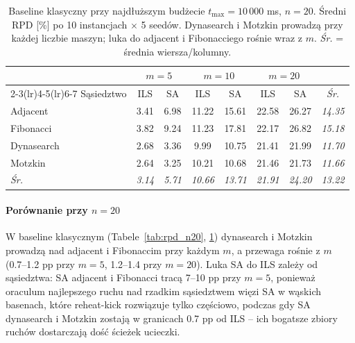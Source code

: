 \documentclass[11pt,a4paper]{article}
\begin{document}
\begin{table}[h]
\centering
\caption{Baseline klasyczny przy najdłuższym budżecie
  $t_{\max}=10\,000$ ms, $n=20$. Średni RPD [\%] po 10 instancjach
  $\times$ 5 seedów. Dynasearch i Motzkin prowadzą przy każdej
  liczbie maszyn; luka do adjacent i Fibonacciego rośnie wraz z $m$.
  \emph{Śr.} = średnia wiersza/kolumny.}
\label{tab:rpd_n20_full}
\small
\setlength{\tabcolsep}{4pt}
\begin{tabular}{@{}lcccccc@{\quad}c@{}}
\toprule
 & \multicolumn{2}{c}{$m=5$} & \multicolumn{2}{c}{$m=10$} & \multicolumn{2}{c}{$m=20$} & \\
\cmidrule(lr){2-3}\cmidrule(lr){4-5}\cmidrule(lr){6-7}
Sąsiedztwo & ILS & SA & ILS & SA & ILS & SA & \emph{Śr.} \\
\midrule
Adjacent    & 3.41 &  6.98 & 11.22 & 15.61 & 22.58 & 26.27 & \emph{14.35} \\
Fibonacci   & 3.82 &  9.24 & 11.23 & 17.81 & 22.17 & 26.82 & \emph{15.18} \\
Dynasearch  & 2.68 &  3.36 &  9.99 & 10.75 & 21.41 & 21.99 & \emph{11.70} \\
Motzkin     & 2.64 &  3.25 & 10.21 & 10.68 & 21.46 & 21.73 & \emph{11.66} \\
\midrule
\emph{Śr.}  & \emph{3.14} & \emph{5.71} & \emph{10.66} & \emph{13.71} & \emph{21.91} & \emph{24.20} & \emph{13.22} \\
\bottomrule
\end{tabular}
\end{table}

\paragraph{Porównanie przy $n=20$}
W baseline klasycznym (Tabele~\ref{tab:rpd_n20},
\ref{tab:rpd_n20_full}) dynasearch i Motzkin prowadzą nad adjacent
i Fibonaccim przy każdym $m$, a przewaga rośnie z $m$ (0.7--1.2 pp
przy $m=5$, 1.2--1.4 przy $m=20$). Luka SA do ILS zależy od
sąsiedztwa: SA adjacent i Fibonacci tracą 7--10 pp przy $m=5$,
ponieważ oraculum najlepszego ruchu nad rzadkim sąsiedztwem więzi SA
w wąskich basenach, które reheat-kick rozwiązuje tylko częściowo,
podczas gdy SA dynasearch i Motzkin zostają w granicach 0.7 pp od ILS
-- ich bogatsze zbiory ruchów dostarczają dość ścieżek ucieczki.
\end{document}
